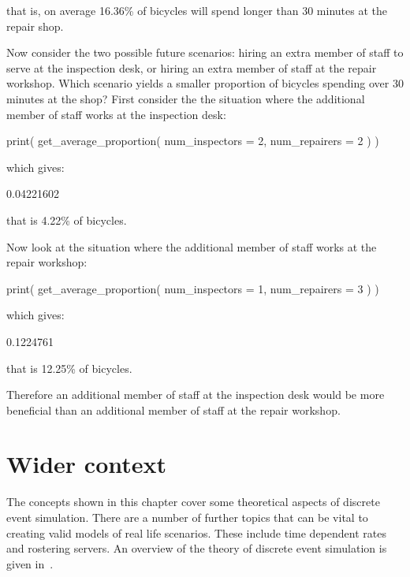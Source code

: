 that is, on average 16.36\% of bicycles will spend longer than 30 minutes at the
repair shop.

Now consider the two possible future scenarios: hiring an
extra member of staff to serve at the inspection desk, or hiring an extra member
of staff at the repair workshop. Which scenario yields a smaller proportion of
bicycles spending over 30 minutes at the shop? First consider the
the situation where the additional member of staff works at the inspection desk:

\begin{Rin}
print(
  get_average_proportion(
    num_inspectors = 2,
    num_repairers = 2
  )
)
\end{Rin}

which gives:

\begin{Rout}
[1] 0.04221602
\end{Rout}

that is 4.22\% of bicycles.

Now look at the situation where the additional member of staff works at the
repair workshop:

\begin{Rin}
print(
  get_average_proportion(
    num_inspectors = 1,
    num_repairers = 3
  )
)
\end{Rin}

which gives:

\begin{Rout}
[1] 0.1224761
\end{Rout}

that is 12.25\% of bicycles.

Therefore an additional member of staff at the inspection desk would be more
beneficial than an additional member of staff at the repair workshop.

\section{Wider context}\label{sec:discrete_event_simulation_wider_context}

The concepts shown in this chapter cover some theoretical aspects of discrete
event simulation. There are a number of further topics that can be vital to
creating valid models of real life scenarios. These include time dependent rates
and rostering servers. An overview of the theory of discrete event simulation is
given in~\parencite{robinson2004simulation}.

